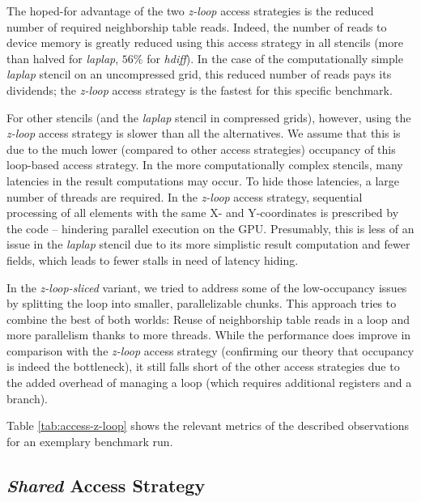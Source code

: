 The hoped-for advantage of the two \emph{z-loop} access strategies is the reduced number of required neighborship table reads. Indeed, the number of reads to device memory is greatly reduced using this access strategy in all stencils (more than halved for \emph{laplap}, $56\%$ for \emph{hdiff}). In the case of the computationally simple \emph{laplap} stencil on an uncompressed grid, this reduced number of reads pays its dividends; the \emph{z-loop} access strategy is the fastest for this specific benchmark.

For other stencils (and the \emph{laplap} stencil in compressed grids), however, using the \emph{z-loop} access strategy is slower than all the alternatives.  We assume that this is due to the much lower (compared to other access strategies) occupancy of this loop-based access strategy. In the more computationally complex stencils, many latencies in the result computations may occur. To hide those latencies, a large number of threads are required. In the \emph{z-loop} access strategy, sequential processing of all elements with the same X- and Y-coordinates is prescribed by the code -- hindering parallel execution on the GPU. Presumably, this is less of an issue in the \emph{laplap} stencil due to its more simplistic result computation and fewer fields, which leads to fewer stalls in need of latency hiding.

In the \emph{z-loop-sliced} variant, we tried to address some of the low-occupancy issues by splitting the loop into smaller, parallelizable chunks. This approach tries to combine the best of both worlds: Reuse of neighborship table reads in a loop and more parallelism thanks to more threads. While the performance does improve in comparison with the \emph{z-loop} access strategy (confirming our theory that occupancy is indeed the bottleneck), it still falls short of the other access strategies due to the added overhead of managing a loop (which requires additional registers and a branch).

Table \ref{tab:access-z-loop} shows the relevant metrics of the described observations for an exemplary benchmark run.


\subsection{\emph{Shared} Access Strategy}

